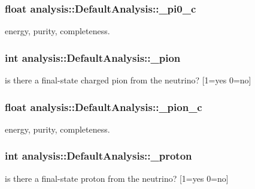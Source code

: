 \subsubsection[{\texorpdfstring{\+\_\+pi0\+\_\+c}{_pi0_c}}]{\setlength{\rightskip}{0pt plus 5cm}float analysis\+::\+Default\+Analysis\+::\+\_\+pi0\+\_\+c\hspace{0.3cm}{\ttfamily [private]}}\hypertarget{classanalysis_1_1DefaultAnalysis_a255069926e7e8a83629b9dac19bf7473}{}\label{classanalysis_1_1DefaultAnalysis_a255069926e7e8a83629b9dac19bf7473}
energy, purity, completeness. 
\subsubsection[{\texorpdfstring{\+\_\+pion}{_pion}}]{\setlength{\rightskip}{0pt plus 5cm}int analysis\+::\+Default\+Analysis\+::\+\_\+pion\hspace{0.3cm}{\ttfamily [private]}}\hypertarget{classanalysis_1_1DefaultAnalysis_ac146d38b0cac5f30ea28c76f21cacdb1}{}\label{classanalysis_1_1DefaultAnalysis_ac146d38b0cac5f30ea28c76f21cacdb1}
is there a final-\/state charged pion from the neutrino? \mbox{[}1=yes 0=no\mbox{]} 
\subsubsection[{\texorpdfstring{\+\_\+pion\+\_\+c}{_pion_c}}]{\setlength{\rightskip}{0pt plus 5cm}float analysis\+::\+Default\+Analysis\+::\+\_\+pion\+\_\+c\hspace{0.3cm}{\ttfamily [private]}}\hypertarget{classanalysis_1_1DefaultAnalysis_a9978effbcfba62536fc88a73fa985fe9}{}\label{classanalysis_1_1DefaultAnalysis_a9978effbcfba62536fc88a73fa985fe9}
energy, purity, completeness. 
\subsubsection[{\texorpdfstring{\+\_\+proton}{_proton}}]{\setlength{\rightskip}{0pt plus 5cm}int analysis\+::\+Default\+Analysis\+::\+\_\+proton\hspace{0.3cm}{\ttfamily [private]}}\hypertarget{classanalysis_1_1DefaultAnalysis_a8fd1f5d981dc5860f0c829c2b88a1363}{}\label{classanalysis_1_1DefaultAnalysis_a8fd1f5d981dc5860f0c829c2b88a1363}
is there a final-\/state proton from the neutrino? \mbox{[}1=yes 0=no\mbox{]} 
